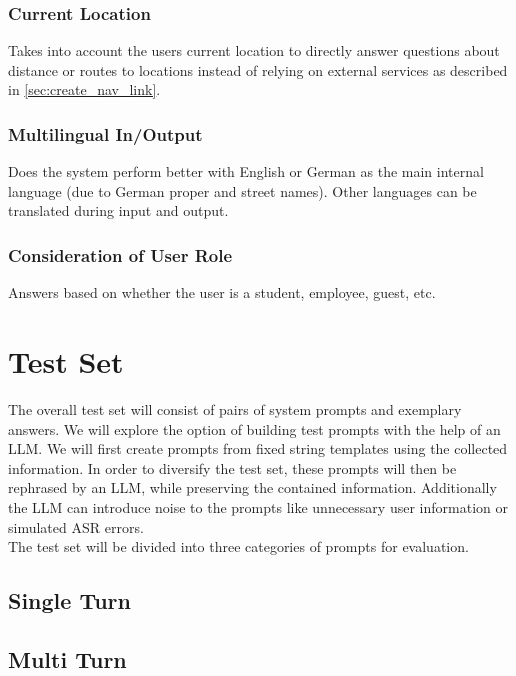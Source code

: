 \documentclass{article}
\begin{document}
\subsubsection{Current Location} \label{sec:curr_loc}
Takes into account the users current location to directly answer questions about distance or routes to locations instead of relying on external services as described in \ref{sec:create_nav_link}.

\subsubsection{Multilingual In/Output}
Does the system perform better with English or German as the main internal language (due to German proper and street names). Other languages can be translated during input and output.

\subsubsection{Consideration of User Role}
Answers based on whether the user is a student, employee, guest, etc.


\section{Test Set}
The overall test set will consist of pairs of system prompts and exemplary answers. We will explore the option of building test prompts with the help of an LLM. We will first create prompts from fixed string templates using the collected information. In order to diversify the test set, these prompts will then be rephrased by an LLM, while preserving the contained information. Additionally the LLM can introduce noise to the prompts like unnecessary user information or simulated ASR errors.\\

The test set will be divided into three categories of prompts for evaluation.

\subsection{Single Turn}

\subsection{Multi Turn}
\end{document}

